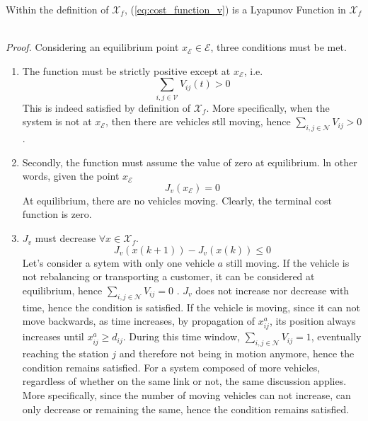 \begin{proposition}{}
	Within the definition of $\mathcal{X}_f$, (\ref{eq:cost_function_v}) is a Lyapunov Function in $\mathcal{X}_f$
\end{proposition}\\
\textit{Proof. } Considering an equilibrium point $x_{\mathcal{E}}\in\mathcal{E}$, three conditions must be met.\\
\begin{enumerate}
	\item The function must be strictly positive except at $x_{\mathcal{E}}$, i.e.
	\begin{equation*}
		\sum_{i,j \in \mathcal{V}}V_{ij}(t) >0
	\end{equation*}
	This is indeed satisfied by definition of $\mathcal{X}_f$. More specifically, when the system is not at $x_{\mathcal{E}}$, then there are vehicles stll moving, hence $\sum_{i,j \in \mathcal{N}}V_{ij} >0$. 
	\item Secondly, the function must assume the value of zero at equilibrium. ln other words, given the point $x_{\mathcal{E}}$
	\begin{equation*}
		J_v(x_{\mathcal{E}}) = 0
	\end{equation*}
	At equilibrium, there are no vehicles moving. Clearly, the terminal cost function is zero. 
	\item $J_v$ must decrease $\forall x \in \mathcal{X}_f$. 
	\begin{equation*}
		J_v(x(k+1)) - J_v(x(k))\leq 0
	\end{equation*}
	Let's consider a sytem with only one vehicle $a$ still moving. If the vehicle is not rebalancing or transporting a customer, it can be considered at equilibrium, hence $\sum_{i,j \in \mathcal{N}}V_{ij} =0$ . $J_v$ does not increase nor decrease with time, hence the condition is satisfied. If the vehicle is moving, since it can not move backwards, as time increases, by propagation of $x_{ij}^a$, its position always increases until $x_{ij}^a \ge d_{ij}$. During this time window, $\sum_{i,j \in \mathcal{N}}V_{ij} =1$, eventually reaching the station $j$ and therefore not being in motion anymore, hence the condition remains satisfied. For a system composed of more vehicles, regardless of whether on the same link or not, the same discussion applies. More specifically, since the number of moving vehicles can not increase, can only decrease or remaining the same, hence the condition remains satisfied.
\end{enumerate}


